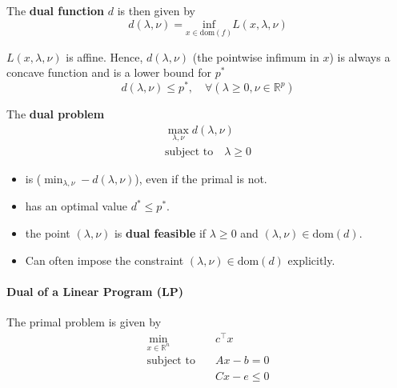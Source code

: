 The \textbf{dual function} $d$ is then given by
\begin{equation*}
    d(\lambda, \nu) = \underset{x\in\text{dom}(f)}{\text{inf}} L(x,\lambda,\nu)
\end{equation*}

$L(x,\lambda,\nu)$ is affine. Hence, $d(\lambda, \nu)$ (the pointwise infimum in $x$) is always a concave function and is a lower bound for $p^*$
\begin{equation*}
    d(\lambda,\nu)\leq p^*, \quad \forall(\lambda \geq 0, \nu \in \mathbb{R}^p)
\end{equation*}

The \textbf{dual problem}
\begin{gather*}
    \max_{\lambda,\nu} d(\lambda, \nu) \\
    \text{subject to}\quad \lambda \geq 0
\end{gather*}
\begin{itemize}
    \item is  ($\min_{\lambda,\nu} -d(\lambda, \nu) $), even if the primal is not. %
    \item has an optimal value $d^* \leq p^*$.
    \item the point $(\lambda,\nu)$ is \textbf{dual feasible} if $\lambda \geq 0$ and $(\lambda, \nu) \in \text{dom}(d)$.
    \item Can often impose the constraint $(\lambda, \nu)\in \mathrm{dom}(d)$ explicitly. %
\end{itemize}

\paragraph{Dual of a Linear Program (LP)}
The primal problem is given by
\begin{align*}
    \min_{x\in\mathbb{R}^n} & c^\top x    \\
    \text{subject to}\quad  & Ax-b = 0    \\
                            & Cx-e \leq 0
\end{align*}

